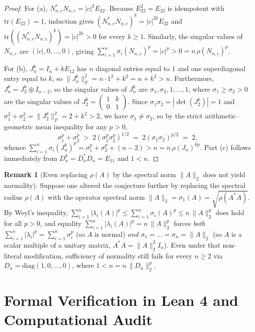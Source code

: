 \documentclass[11pt,a4paper]{article}
\theoremstyle{plain}
\theoremstyle{definition}
\newtheorem{remark}[theorem]{Remark}
\newcommand{\tr}{\mathrm{tr}}
\newcommand{\diag}{\mathrm{diag}}
\begin{document}
\begin{proof}
For (a), $N_{n,c}^* N_{n,c} = |c|^2 E_{22}$. Because $E_{22}^2 = E_{22}$ is idempotent with $\tr(E_{22}) = 1$, induction gives $(N_{n,c}^* N_{n,c})^k = |c|^{2k} E_{22}$ and $\tr((N_{n,c}^* N_{n,c})^k) = |c|^{2k} > 0$ for every $k \ge 1$. Similarly, the singular values of $N_{n,c}$ are $(|c|, 0, \dots, 0)$, giving $\sum_{i=1}^n \sigma_i(N_{n,c})^p = |c|^p > 0 = n\,\rho(N_{n,c})^p$.

For (b), $J_n^k = I_n + k E_{12}$ has $n$ diagonal entries equal to $1$ and one superdiagonal entry equal to $k$, so $\|J_n^k\|_F^2 = n \cdot 1^2 + k^2 = n + k^2 > n$. Furthermore, $J_n^k = J_2^k \oplus I_{n-2}$, so the singular values of $J_n^k$ are $\sigma_1, \sigma_2, 1, \dots, 1$, where $\sigma_1 \ge \sigma_2 > 0$ are the singular values of $J_2^k = \begin{pmatrix} 1 & k \\ 0 & 1 \end{pmatrix}$. Since $\sigma_1 \sigma_2 = |\det(J_2^k)| = 1$ and $\sigma_1^2 + \sigma_2^2 = \|J_2^k\|_F^2 = 2 + k^2 > 2$, we have $\sigma_1 \ne \sigma_2$, so by the strict arithmetic--geometric mean inequality for any $p > 0$,
\[
  \sigma_1^p + \sigma_2^p \;>\; 2(\sigma_1^p \sigma_2^p)^{1/2} \;=\; 2(\sigma_1 \sigma_2)^{p/2} \;=\; 2,
\]
whence $\sum_{i=1}^n \sigma_i(J_n^k)^p = \sigma_1^p + \sigma_2^p + (n-2) > n = n\,\rho(J_n)^{kp}$. Part (c) follows immediately from $D_n^k = D_n^* D_n = E_{11}$ and $1 < n$.
\end{proof}

\begin{remark}[Even replacing $\rho(A)$ by the spectral norm $\|A\|_2$ does not yield normality]
Suppose one altered the conjecture further by replacing the spectral radius $\rho(A)$ with the operator spectral norm $\|A\|_2 = \sigma_1(A) = \sqrt{\rho(A^* A)}$. By Weyl's inequality, $\sum_{i=1}^n |\lambda_i(A)|^p \le \sum_{i=1}^n \sigma_i(A)^p \le n\,\|A\|_2^p$ does hold for all $p > 0$, and equality $\sum_{i=1}^n |\lambda_i(A)|^p = n\,\|A\|_2^p$ forces \emph{both} $\sum_{i=1}^n |\lambda_i|^p = \sum_{i=1}^n \sigma_i^p$ (so $A$ is normal) \emph{and} $\sigma_1 = \dots = \sigma_n = \|A\|_2$ (so $A$ is a scalar multiple of a unitary matrix, $A^* A = \|A\|_2^2 I_n$). Even under that non-literal modification, sufficiency of normality still fails for every $n \ge 2$ via $D_n = \diag(1,0,\dots,0)$, where $1 < n = n\,\|D_n\|_2^p$.
\end{remark}

\section{Formal Verification in Lean 4 and Computational Audit}
\end{document}

